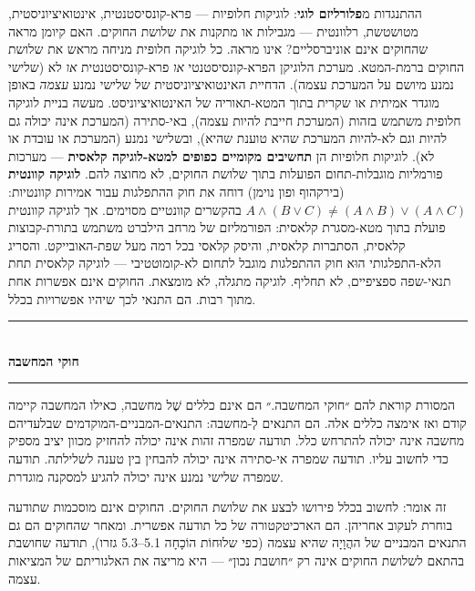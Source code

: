 \documentclass[10pt, openany, oneside]{book}
\renewcommand{\normalsize}{\fontsize{10}{13}\selectfont}
\begin{document}
ההתנגדות מ\textbf{פלורליזם לוגי}: לוגיקות חלופיות — פרא-קונסיסטנטית, אינטואיציוניסטית, מטושטשת, רלוונטית — מגבילות או מתקנות את שלושת החוקים. האם קיומן מראה שהחוקים אינם אוניברסליים? אינו מראה. כל לוגיקה חלופית מניחה מראש את שלושת החוקים ברמת-המטא. מערכת הלוגיקן הפרא-קונסיסטנטי \textit{או} פרא-קונסיסטנטית \textit{או} לא (שלישי נמנע מיושם על המערכת עצמה). הדחיית האינטואיציוניסטית של שלישי נמנע \textit{עצמה} באופן מוגדר אמיתית או שקרית בתוך המטא-תאוריה של האינטואיציוניסט. מעשה בניית לוגיקה חלופית משתמש בזהות (המערכת חייבת להיות עצמה), באי-סתירה (המערכת אינה יכולה גם להיות וגם לא-להיות המערכת שהיא טוענת שהיא), ובשלישי נמנע (המערכת או עובדת או לא). לוגיקות חלופיות הן \textbf{תחשיבים מקומיים כפופים למטא-לוגיקה קלאסית} — מערכות פורמליות מוגבלות-תחום הפועלות בתוך שלושת החוקים, לא מחוצה להם. \textbf{לוגיקה קוונטית} (בירקהוף ופון נוימן) דוחה את חוק ההתפלגות עבור אמירות קוונטיות: $A \wedge (B \vee C) \neq (A \wedge B) \vee (A \wedge C)$ בהקשרים קוונטיים מסוימים. אך לוגיקה קוונטית פועלת בתוך מטא-מסגרת קלאסית: הפורמליזם של מרחב הילברט משתמש בתורת-קבוצות קלאסית, הסתברות קלאסית, והיסק קלאסי בכל רמה מעל שפת-האובייקט. והסריג הלא-התפלגותי הוּא חוק ההתפלגות מוגבל לתחום לא-קומוטטיבי — לוגיקה קלאסית תחת תנאי-שפה ספציפיים, לא תחליף. לוגיקה מתגלה, לא מומצאת. החוקים אינם אפשרות אחת מתוך רבות. הם התנאי לכך שיהיו אפשרויות בכלל.


\vspace{1.5em}

\begin{center}
    \rule{0.3\textwidth}{0.4pt}\\[0.5em]
    {\normalsize\bfseries\textsc{חוקי המחשבה}}\\[0.3em]
    \rule{0.3\textwidth}{0.4pt}
\end{center}

\vspace{1em}

\noindent המסורת קוראת להם ״חוקי המחשבה.״ הם אינם כללים שֶׁל מחשבה, כאילו המחשבה קיימה קודם ואז אימצה כללים אלה. הם התנאים לְ-מחשבה: התנאים-המבניים-המוקדמים שבלעדיהם מחשבה אינה יכולה להתרחש כלל. תודעה שמפרה זהות אינה יכולה להחזיק מכוון יציב מספיק כדי לחשוב עליו. תודעה שמפרה אי-סתירה אינה יכולה להבחין בין טענה לשלילתה. תודעה שמפרה שלישי נמנע אינה יכולה להגיע למסקנה מוגדרת.

זה אומר: לחשוב בכלל פירושו לבצע את שלושת החוקים. החוקים אינם מוסכמות שתודעה בוחרת לעקוב אחריהן. הם הארכיטקטורה של כל תודעה אפשרית. ומאחר שהחוקים הם גם התנאים המבניים של ההֲוָיָה שהיא עצמה (כפי שלוּחוֹת הוֹכָחָה 5.1–5.3 גזרו), תודעה שחושבת בהתאם לשלושת החוקים אינה רק ״חושבת נכון״ — היא מריצה את האלגוריתם של המציאות עצמה.
\end{document}
